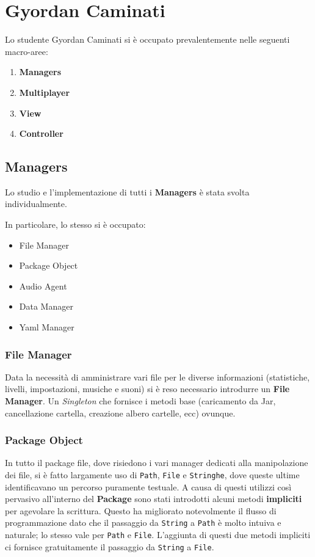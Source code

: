 \section{Gyordan Caminati}

Lo studente Gyordan Caminati si è occupato prevalentemente nelle seguenti macro-aree:

\begin{enumerate}
    \item \textbf{Managers}
    \item \textbf{Multiplayer}
    \item \textbf{View}
    \item \textbf{Controller}
\end{enumerate}

\subsection{Managers}
    Lo studio e l'implementazione di tutti i \textbf{Managers} è stata svolta individualmente.
    
    In particolare, lo stesso si è occupato:
    
    \begin{itemize}
        \item File Manager
        \item Package Object
	    \item Audio Agent
	    \item Data Manager
	    \item Yaml Manager
    \end{itemize}
    
    \subsubsection{File Manager}
    Data la necessità di amministrare vari file per le diverse informazioni (statistiche, livelli, impostazioni, musiche 
    e suoni) si è reso necessario introdurre un \textbf{File Manager}.
    Un \textit{Singleton} che fornisce i metodi base (caricamento da Jar, cancellazione cartella, creazione albero cartelle, ecc) ovunque.
        
    \subsubsection{Package Object}
    In tutto il package file, dove risiedono i vari manager dedicati alla manipolazione dei file, si è fatto largamente uso di
    \texttt{Path}, \texttt{File} e \texttt{Stringhe}, dove queste ultime identificavano un percorso puramente testuale.
    A causa di questi utilizzi così pervasivo all'interno del \textbf{Package} sono stati introdotti alcuni metodi \textbf{impliciti} per agevolare la scrittura.
    Questo ha migliorato notevolmente il flusso di programmazione dato che il passaggio da \texttt{String} a \texttt{Path} è molto intuiva e naturale; lo stesso vale per \texttt{Path} e \texttt{File}.
    L'aggiunta di questi due metodi impliciti ci fornisce gratuitamente il passaggio da \texttt{String} a \texttt{File}.
    
